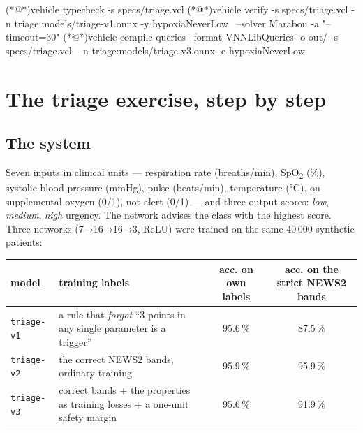 \documentclass[11pt]{article}
\begin{document}
\begin{shellbox}
(*@\tprompt@*)vehicle typecheck -s specs/triage.vcl
(*@\tprompt@*)vehicle verify -s specs/triage.vcl -n triage:models/triage-v1.onnx -y hypoxiaNeverLow \
      --solver Marabou -a "--timeout=30"
(*@\tprompt@*)vehicle compile queries --format VNNLibQueries -o out/ -s specs/triage.vcl \
      -n triage:models/triage-v3.onnx -e hypoxiaNeverLow
\end{shellbox}

\section{The triage exercise, step by step}
\subsection*{The system}
Seven inputs in clinical units — respiration rate (breaths/min), SpO\textsubscript{2} (\%), systolic blood pressure (mmHg), pulse (beats/min), temperature (°C), on supplemental oxygen (0/1), not alert (0/1) — and three output scores: \emph{low}, \emph{medium}, \emph{high} urgency. The network advises the class with the highest score. Three networks (7→16→16→3, ReLU) were trained on the same 40\,000 synthetic patients:

\begin{tabularx}{\textwidth}{@{}lXcc@{}}
\toprule
model & training labels & acc. on own labels & acc. on the strict NEWS2 bands\\
\midrule
\texttt{triage-v1} & a rule that \emph{forgot} ``3 points in any single parameter is a trigger'' & 95.6\,\% & 87.5\,\%\\
\texttt{triage-v2} & the correct NEWS2 bands, ordinary training & 95.9\,\% & 95.9\,\%\\
\texttt{triage-v3} & correct bands + the properties as training losses + a one-unit safety margin & 95.6\,\% & 91.9\,\%\\
\bottomrule
\end{tabularx}
\end{document}
